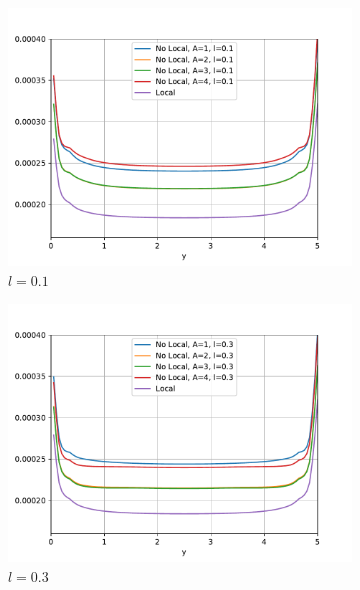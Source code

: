 		\begin{figure}
		    \centering
		    \sffamily
		    \begin{subfigure}{0.48\textwidth}
		    \centering
		        \includegraphics[width=\textwidth]{figuras/Placa/Perfiles/X/X0.1_0.019.pdf}
		        \caption{$l=0.1$}
		        \label{fig:perfilesX0019.01}
		    \end{subfigure}
		    \begin{subfigure}{0.48\textwidth}
		    \centering
		        \includegraphics[width=\textwidth]{figuras/Placa/Perfiles/X/X0.3_0.019.pdf}
		        \caption{$l=0.3$}
		        \label{fig:perfilesX0019.03}
		    \end{subfigure}
		    \quad
		    \begin{subfigure}{0.48\textwidth}

\end{subfigure}
\end{figure}
